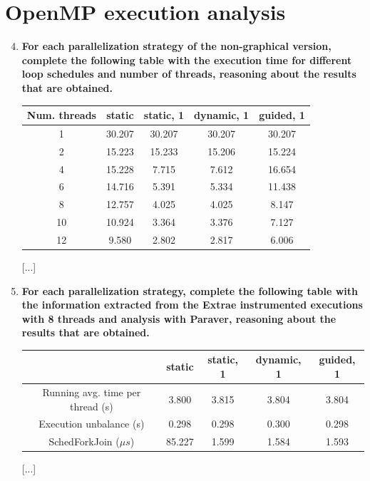 \documentclass[a4paper,11pt]{article}
\begin{document}
\section{OpenMP execution analysis}
\begin{enumerate}
\setcounter{enumi}{3}
\item
\textbf{For each parallelization strategy of the non-graphical version, complete the following table with
    the execution time for different loop schedules and number of threads, reasoning about the results
    that are obtained.}
\begin{center}
\begin{tabular}{| c || c | c | c | c |}
\hline
\textbf{Num. threads} & \textbf{static} & \textbf{static, 1} & \textbf{dynamic, 1} & \textbf{guided, 1}
\\
\hline
\hline
1 & 30.207 & 30.207 & 30.207 & 30.207
\\
\hline
2 & 15.223 & 15.233 & 15.206 & 15.224
\\
\hline
4 & 15.228 & 7.715 & 7.612 & 16.654
\\
\hline
6 & 14.716 & 5.391 & 5.334 & 11.438
\\
\hline
8 & 12.757 & 4.025 & 4.025 & 8.147
\\
\hline
10 & 10.924 & 3.364 & 3.376 & 7.127
\\
\hline
12 & 9.580 & 2.802 & 2.817 & 6.006
\\
\hline
\end{tabular}
\end{center}
[...]
\setcounter{enumi}{4}
\item
\textbf{For each parallelization strategy, complete the following table with the information extracted from
    the Extrae instrumented executions with 8 threads and analysis with Paraver, reasoning about the
    results that are obtained.}
\begin{center}
\begin{tabular}{| c || c | c | c | c |}
\hline
\textbf{} & \textbf{static} & \textbf{static, 1} & \textbf{dynamic, 1} & \textbf{guided, 1}
\\
\hline
\hline
Running avg. time per thread (s) & 3.800 & 3.815 & 3.804 & 3.804
\\
\hline
Execution unbalance (s) & 0.298 & 0.298 & 0.300 & 0.298
\\
\hline
SchedForkJoin ($\mu s$) & 85.227 & 1.599 & 1.584 & 1.593
\\
\hline
\end{tabular}
\end{center}
[...]
\end{enumerate}
\end{document}
